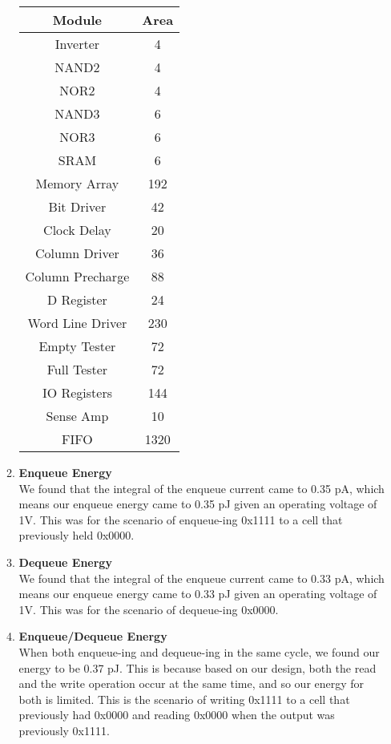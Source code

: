 \documentclass[11pt]{article}
\theoremstyle{definition}
\begin{document}
\begin{enumerate}
\begin{enumerate}
\begin{center}
\begin{tabular} { | c || c | }
	\hline
    Module & Area \\
    \hline
    Inverter & 4 \\
    NAND2 & 4 \\
    NOR2 & 4 \\
    NAND3 & 6 \\
    NOR3 & 6 \\
    SRAM & 6 \\
    Memory Array & 192 \\
    Bit Driver & 42 \\
    Clock Delay & 20 \\
    Column Driver & 36 \\
    Column Precharge & 88 \\
    D Register & 24 \\
    Word Line Driver & 230 \\
    Empty Tester & 72 \\
    Full Tester & 72 \\
    IO Registers & 144 \\
    Sense Amp & 10 \\
    FIFO & 1320 \\
    \hline
\end{tabular}
\end{center}


\item \textbf{Enqueue Energy}\\
We found that the integral of the enqueue current came to 0.35 pA, which means our enqueue energy came to 0.35 pJ given an operating voltage of 1V. This was for the scenario of enqueue-ing 0x1111 to a cell that previously held 0x0000.

\item \textbf{Dequeue Energy}\\
We found that the integral of the enqueue current came to 0.33 pA, which means our enqueue energy came to 0.33 pJ given an operating voltage of 1V. This was for the scenario of dequeue-ing 0x0000. 

\item \textbf{Enqueue/Dequeue Energy}\\
When both enqueue-ing and dequeue-ing in the same cycle, we found our energy to be 0.37 pJ. This is because based on our design, both the read and the write operation occur at the same time, and so our energy for both is limited. This is the scenario of writing 0x1111 to a cell that previously had 0x0000 and reading 0x0000 when the output was previously 0x1111.


\end{enumerate}
\end{enumerate}
\end{document}
